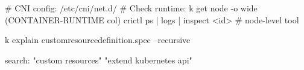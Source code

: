 \begin{tcbitemize}[
  raster columns=2, raster equal height=rows,
  blanker, cheat subtitle
]
  \begin{cheatcodebash}
# CNI config:  /etc/cni/net.d/
# Check runtime: k get node -o wide (CONTAINER-RUNTIME col)
crictl ps | logs | inspect <id>   # node-level tool
  \end{cheatcodebash}

  \begin{cheatcodebash}
k explain customresourcedefinition.spec --recursive
  \end{cheatcodebash}
  \begin{cheatcodebash}
search: "custom resources" "extend kubernetes api"
  \end{cheatcodebash}

\end{tcbitemize}
